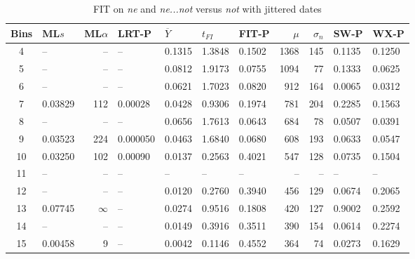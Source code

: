 \begin{table}[ht]
\centering
\begin{tabular}{c  l  r  l  l  l  l   r  r  l  l}
  \hline
Bins & ML$s$ & ML$\alpha$ & LRT-P & $\overline{Y}$ & $t_{FI}$ & FIT-P & $\mu$ & $\sigma_n$ & SW-P  & WX-P\\ 
  \hline
  4 & -- & -- & -- & 0.1315 & 1.3848 & 0.1502 & 1368 & 145 & 0.1135 & 0.1250 \\ 
  5 & -- & -- & -- & 0.0812 & 1.9173 & 0.0755 & 1094 & 77 & 0.1333 & 0.0625\\ 
  6 & -- & -- & -- & 0.0621 & 1.7023 & 0.0820 & 912 & 164 & 0.0065 & 0.0312\\ 
  7 & 0.03829 & 112 & 0.00028 & 0.0428 & 0.9306 & 0.1974 & 781 & 204 & 0.2285 & 0.1563\\ 
  8 & -- & -- & -- & 0.0656 & 1.7613 & 0.0643 & 684 & 78 & 0.0507 & 0.0391\\ 
  9 & 0.03523 & 224 & 0.000050 & 0.0463 & 1.6840 & 0.0680 & 608 & 193 & 0.0633 & 0.0547\\ 
  10 & 0.03250 & 102 & 0.00090 & 0.0137 & 0.2563 & 0.4021 & 547 & 128 & 0.0735 & 0.1504\\  
  11 & -- & -- & -- & -- & -- & -- & -- & -- & -- & --\\  
  12 & -- & -- & -- & 0.0120 & 0.2760 & 0.3940 & 456 & 129 & 0.0674 & 0.2065\\
  13 & 0.07745 & $\infty$ & -- & 0.0274 & 0.9516 & 0.1808 & 420 & 127 & 0.9002 & 0.2592\\
  14 & -- & -- & -- & 0.0149 & 0.3916 & 0.3511 & 390 & 154 & 0.0614 & 0.2274\\
  15 & 0.00458 & 9 & -- & 0.0042 & 0.1146 & 0.4552 & 364 & 74   & 0.0273 & 0.1629\\
  \hline
  \end{tabular}
\caption{FIT on \textit{\color{red}  ne} and \textit{\color{blue} ne...not} versus  \textit{\color{green} not} with jittered dates}
\label{jitter-lump-table2}
\end{table}

